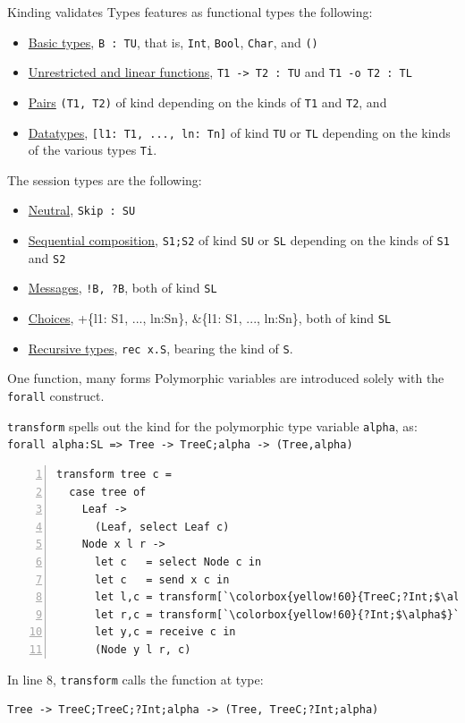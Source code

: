 \documentclass[10pt]{beamer}
\begin{document}
\begin{frame}{Kinding validates Types}
\freest{} features as functional types the following:
\begin{itemize}
\item \underline{Basic types}, \lstinline|B : TU|, that is, \lstinline|Int|,
  \lstinline|Bool|, \lstinline|Char|, and \lstinline|()|
\item \underline{Unrestricted and linear functions}, \lstinline|T1 -> T2 : TU| and
  \lstinline|T1 -o T2 : TL|
\item \underline{Pairs} \lstinline|(T1, T2)| of kind
  depending on the kinds of
  \lstinline|T1| and \lstinline|T2|, and
\item \underline{Datatypes}, \lstinline|[l1: T1, ..., ln: Tn]| of kind
  \lstinline|TU| or \lstinline|TL| depending on the kinds of the
  various types \lstinline|Ti|.
\end{itemize}
\pause

The session types are the following:
\begin{itemize}
\item \underline{Neutral}, \lstinline|Skip : SU|
\item \underline{Sequential composition}, \lstinline|S1;S2| of kind \lstinline|SU|
  or \lstinline|SL| depending on the kinds of \lstinline|S1| and
  \lstinline|S2|
\item  \underline{Messages}, \lstinline|!B, ?B|, both of kind \lstinline|SL|
\item \underline{Choices}, +\{l1: S1, ..., ln:Sn\}, \&\{l1: S1, ..., ln:Sn\},
  both of kind \lstinline|SL|
\item \underline{Recursive types}, \lstinline|rec x.S|, bearing the kind of
  \lstinline|S|.
\end{itemize}
	
\end{frame}

\begin{frame}[fragile]{One function, many forms}
	Polymorphic variables are introduced solely with the \lstinline|forall| construct.
	
	\lstinline|transform| spells out the kind for the polymorphic type variable \lstinline|alpha|, as:
	\lstinline|forall alpha:SL => Tree -> TreeC;alpha -> (Tree,alpha)|

\pause
\begin{lstlisting}[numbers=left, xleftmargin=0.7cm, escapeinside=\`\`]
transform tree c =
  case tree of
    Leaf ->
      (Leaf, select Leaf c)
    Node x l r ->
      let c   = select Node c in
      let c   = send x c in 
      let l,c = transform[`\colorbox{yellow!60}{TreeC;?Int;$\alpha$}`] l c in
      let r,c = transform[`\colorbox{yellow!60}{?Int;$\alpha$}`] r c in
      let y,c = receive c in
      (Node y l r, c)
\end{lstlisting}

\pause
In line 8, \lstinline|transform| calls the function at type:
\begin{lstlisting}
Tree -> TreeC;TreeC;?Int;alpha -> (Tree, TreeC;?Int;alpha)
\end{lstlisting}
	
\end{frame}
\end{document}
